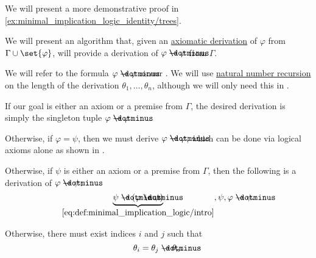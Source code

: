 \begin{comments}
  \item We will present a more demonstrative proof in \eqref{ex:minimal_implication_logic_identity/trees}.
\end{comments}

\begin{algorithm}\label{alg:derivation_conclusion_hypothesis_introduction}
  We will present an algorithm that, given an \hyperref[def:axiomatic_derivation]{axiomatic derivation} of \( \varphi \) from \( \Gamma \cup \set{ \varphi } \), will provide a derivation of \( \varphi \synimplies \varphi \) from \( \Gamma \).

  We will refer to the formula \( \varphi \synimplies \varphi \) as our . We will use \hyperref[rem:natural_number_recursion]{natural number recursion} on the length of the derivation \( \theta_1, \ldots, \theta_n \), although we will only need this in .

  \begin{thmenum}
     If our goal is either an axiom or a premise from \( \Gamma \), the desired derivation is simply the singleton tuple \( \varphi \synimplies \varphi \).

     Otherwise, if \( \varphi = \psi \), then we must derive \( \varphi \synimplies \varphi \), which can be done via logical axioms alone as shown in .

     Otherwise, if \( \psi \) is either an axiom or a premise from \( \Gamma \), then the following is a derivation of \( \varphi \synimplies \psi \):
    \begin{equation*}
      \underbrace{\psi \synimplies (\varphi \synimplies \psi)}_{\eqref{eq:def:minimal_implication_logic/intro}},
      \psi,
      \varphi \synimplies \psi.
    \end{equation*}

     Otherwise, there must exist indices \( i \) and \( j \) such that
    \begin{equation*}
      \theta_i = \theta_j \synimplies \theta_n.
    \end{equation*}


\end{thmenum}
\end{algorithm}
